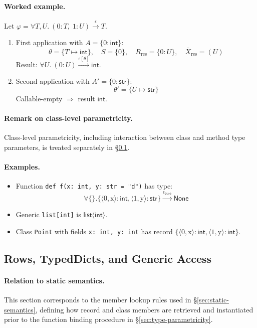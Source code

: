\paragraph{Worked example.}
Let $\varphi = \forall T,U.~(0:T,\;1:U) \xrightarrow{\epsilon} T$.
\begin{enumerate}
  \item First application with $A=\{0:\mathsf{int}\}$:
  \[
    \theta=\{T\mapsto \mathsf{int}\},\quad S=\{0\},\quad
    R_{\mathrm{res}} = \{0:U\},\quad
    \overline{X}_{\mathrm{res}}=(U)
  \]
  Result: $\forall U.~(0:U)\xrightarrow{\epsilon[\theta]} \mathsf{int}$.
  \item Second application with $A'=\{0:\mathsf{str}\}$:
  \[
    \theta'=\{U\mapsto \mathsf{str}\}
  \]
  Callable-empty $\Rightarrow$ result $\mathsf{int}$.
\end{enumerate}

\paragraph{Remark on class-level parametricity.}
Class-level parametricity, including interaction between class and method type parameters,
is treated separately in \S\ref{sec:rows-generic-access}.


\paragraph{Examples.}  
\begin{itemize}
\item Function \texttt{def f(x: int, y: str = "d")} has type:
 \[\forall \{\}.\{\langle 0, \text{x} \rangle : \mathsf{int}, \langle 1, \text{y} \rangle : \mathsf{str}\} \xrightarrow{\epsilon_\mathsf{pure}} \mathsf{None}\]
\item Generic \texttt{list[int]} is $\mathsf{list}\langle\mathsf{int}\rangle$.
\item Class \texttt{Point} with fields \texttt{x: int, y: int} has record $\{\langle 0, \text{x} \rangle : \mathsf{int}, \langle 1, \text{y} \rangle : \mathsf{int}\}$.
\end{itemize}


\subsection{Rows, TypedDicts, and Generic Access}
\label{sec:rows-generic-access}

\paragraph{Relation to static semantics.}
This section corresponds to the member lookup rules used in \S\ref{sec:static-semantics}, defining how record and class members are retrieved and instantiated prior to the function binding procedure in \S\ref{sec:type-parametricity}.

